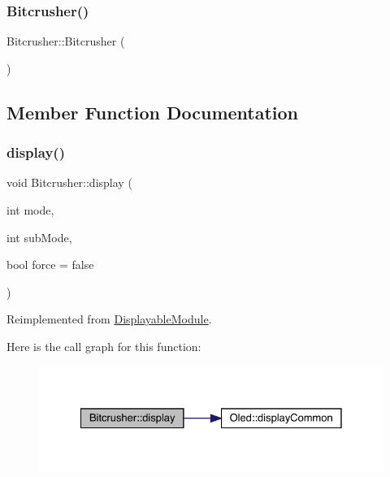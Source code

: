 \subsubsection{\texorpdfstring{Bitcrusher()}{Bitcrusher()}}
{\footnotesize\ttfamily Bitcrusher\+::\+Bitcrusher (\begin{DoxyParamCaption}{ }\end{DoxyParamCaption})}



\subsection{Member Function Documentation}
\mbox{\label{class_bitcrusher_aa5d365b3690a76f968465b9e841720f6}} 
\subsubsection{\texorpdfstring{display()}{display()}}
{\footnotesize\ttfamily void Bitcrusher\+::display (\begin{DoxyParamCaption}\item[{int}]{mode,  }\item[{int}]{sub\+Mode,  }\item[{bool}]{force = {\ttfamily false} }\end{DoxyParamCaption})\hspace{0.3cm}{\ttfamily [virtual]}}



Reimplemented from \mbox{\hyperlink{class_displayable_module_a02de26d62ef508cae9ed07920e21784d}{Displayable\+Module}}.

Here is the call graph for this function\+:\nopagebreak
\begin{figure}[H]
\begin{center}
\leavevmode
\includegraphics[width=328pt]{class_bitcrusher_aa5d365b3690a76f968465b9e841720f6_cgraph}
\end{center}
\end{figure}
\mbox{\label{class_bitcrusher_a8d46a549db08c6c022c55f10b348647d}} 
